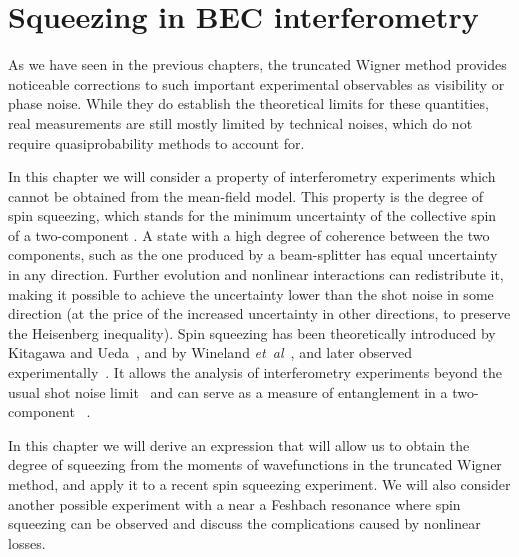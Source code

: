 \chapter{Squeezing in BEC interferometry}
\label{cha:bec-squeezing}

As we have seen in the previous chapters, the truncated Wigner method provides noticeable corrections to such important experimental observables as visibility or phase noise.
While they do establish the theoretical limits for these quantities, real measurements are still mostly limited by technical noises, which do not require quasiprobability methods to account for.

In this chapter we will consider a property of  interferometry experiments which cannot be obtained from the mean-field model.
This property is the degree of spin squeezing, which stands for the minimum uncertainty of the collective spin of a two-component .
A state with a high degree of coherence between the two components, such as the one produced by a beam-splitter has equal uncertainty in any direction.
Further evolution and nonlinear interactions can redistribute it, making it possible to achieve the uncertainty lower than the shot noise in some direction (at the price of the increased uncertainty in other directions, to preserve the Heisenberg inequality).
Spin squeezing has been theoretically introduced by Kitagawa and Ueda~\cite{Kitagawa1993}, and by Wineland \textit{et~al}~\cite{Wineland1994}, and later observed experimentally~\cite{Hald1999,Kuzmich2000}.
It allows the analysis of interferometry experiments beyond the usual shot noise limit~\cite{Riedel2010,Gross2010} and can serve as a measure of entanglement in a two-component ~\cite{Sorensen2001}.

In this chapter we will derive an expression that will allow us to obtain the degree of squeezing from the moments of wavefunctions in the truncated Wigner method, and apply it to a recent spin squeezing experiment.
We will also consider another possible experiment with a  near a Feshbach resonance where spin squeezing can be observed and discuss the complications caused by nonlinear losses.






